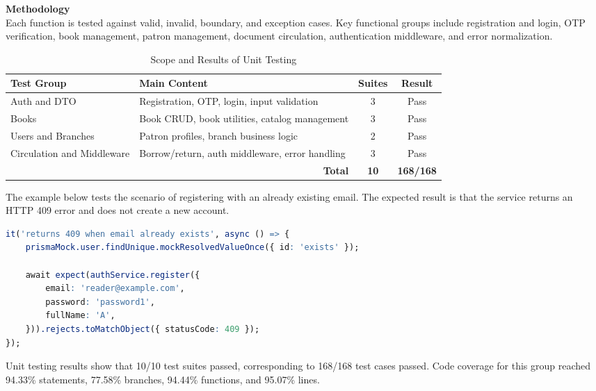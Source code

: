 \noindent \textbf{Methodology} \\

Each function is tested against valid, invalid, boundary, and exception cases. Key functional groups include registration and login, OTP verification, book management, patron management, document circulation, authentication middleware, and error normalization.

\begin{table}[H]
\centering
\caption{Scope and Results of Unit Testing}
\begin{tabularx}{\textwidth}{|p{4.2cm}|X|c|c|}
\hline
\textbf{Test Group} & \textbf{Main Content} & \textbf{Suites} & \textbf{Result} \\
\hline
Auth and DTO & Registration, OTP, login, input validation & 3 & Pass \\
\hline
Books & Book CRUD, book utilities, catalog management & 3 & Pass \\
\hline
Users and Branches & Patron profiles, branch business logic & 2 & Pass \\
\hline
Circulation and Middleware & Borrow/return, auth middleware, error handling & 3 & Pass \\
\hline
\multicolumn{2}{|r|}{\textbf{Total}} & \textbf{10} & \textbf{168/168} \\
\hline
\end{tabularx}
\end{table}

The example below tests the scenario of registering with an already existing email. The expected result is that the service returns an HTTP 409 error and does not create a new account.

\begin{lstlisting}[language=R, caption={Unit test case for registration feature}]
it('returns 409 when email already exists', async () => {
    prismaMock.user.findUnique.mockResolvedValueOnce({ id: 'exists' });

    await expect(authService.register({
        email: 'reader@example.com',
        password: 'password1',
        fullName: 'A',
    })).rejects.toMatchObject({ statusCode: 409 });
});
\end{lstlisting}

Unit testing results show that 10/10 test suites passed, corresponding to 168/168 test cases passed. Code coverage for this group reached 94.33\% statements, 77.58\% branches, 94.44\% functions, and 95.07\% lines. \\

